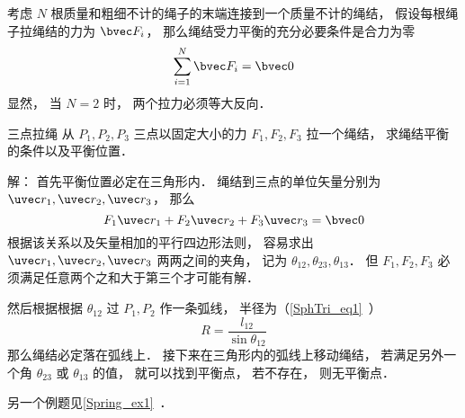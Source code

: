 
考虑 $N$ 根质量和粗细不计的绳子的末端连接到一个质量不计的绳结， 假设每根绳子拉绳结的力为 $\bvec F_i$， 那么绳结受力平衡的充分必要条件是合力为零
\begin{equation}
\sum_{i=1}^N \bvec F_i = \bvec 0
\end{equation}
显然， 当 $N = 2$ 时， 两个拉力必须等大反向．

\begin{example}{三点拉绳}
从 $P_1,P_2,P_3$ 三点以固定大小的力 $F_1, F_2, F_3$ 拉一个绳结， 求绳结平衡的条件以及平衡位置．

解： 首先平衡位置必定在三角形内． 绳结到三点的单位矢量分别为 $\uvec r_1, \uvec r_2, \uvec r_3$， 那么
\begin{equation}
F_1 \uvec r_1 + F_2 \uvec r_2 + F_3 \uvec r_3 = \bvec 0
\end{equation}
根据该关系以及矢量相加的平行四边形法则， 容易求出 $\uvec r_1, \uvec r_2, \uvec r_3$ 两两之间的夹角， 记为 $\theta_{12}, \theta_{23}, \theta_{13}$． 但 $F_1, F_2, F_3$ 必须满足任意两个之和大于第三个才可能有解．

然后根据根据 $\theta_{12}$ 过 $P_1, P_2$ 作一条弧线， 半径为（\autoref{SphTri_eq1}~）
\begin{equation}
R = \frac{l_{12}}{\sin\theta_{12}}
\end{equation}
那么绳结必定落在弧线上． 接下来在三角形内的弧线上移动绳结， 若满足另外一个角 $\theta_{23}$ 或 $\theta_{13}$ 的值， 就可以找到平衡点， 若不存在， 则无平衡点．
\end{example}

另一个例题见\autoref{Spring_ex1}~．
